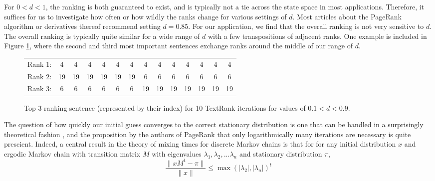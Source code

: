 For $0 < d < 1$, the ranking is both guaranteed to exist, and is typically not a tie across the state space in most applications.
Therefore, it suffices for us to investigate how often or how wildly the ranks change for various settings of $d$.
Most articles about the PageRank algorithm or derivatives thereof recommend setting $d=0.85$.
For our application, we find that the overall ranking is not very sensitive to $d$.
The overall ranking is typically quite similar for a wide range of $d$ with a few transpositions of adjacent ranks.
One example is included in Figure \ref{fig:dsens}, where the second and third most important sentences exchange ranks around the middle of our range of $d$.
\begin{figure}
  \centering
\begin{tabular}{c|ccccccccccccc}
Rank 1:&  4&  4&  4&  4&  4&  4&  4&  4&  4&  4&  4&  4&  4\\
Rank 2:&  19& 19& 19& 19& 19& 19&  6&  6&  6&  6&  6&  6&  6\\
Rank 3:&   6&  6&  6&  6&  6&  6& 19& 19& 19& 19& 19& 19& 19 \\
\end{tabular}
  \caption{Top 3 ranking sentence (represented by their index) for 10 TextRank iterations for values of $0.1 < d < 0.9$.}
  \label{fig:dsens}
\end{figure}

The question of how quickly our initial guess converges to the correct stationary distribution is one that can be handled in a surprisingly theoretical fashion \cite{markovmixing}, and the proposition by the authors of PageRank that only logarithmically many iterations are necessary is quite prescient.
Indeed, a central result in the theory of mixing times for discrete Markov chains is that for for any initial distribution $x$ and ergodic Markov chain with transition matrix $M$ with eigenvalues $\lambda_1, \lambda_2, ... \lambda_n$ and stationary distribution $\pi$,
\begin{equation*}
  \frac{ \| xM^t - \pi \| }{ \| x \|} \leq \max \left(|\lambda_2|, |\lambda_n| \right)^t
\end{equation*}
